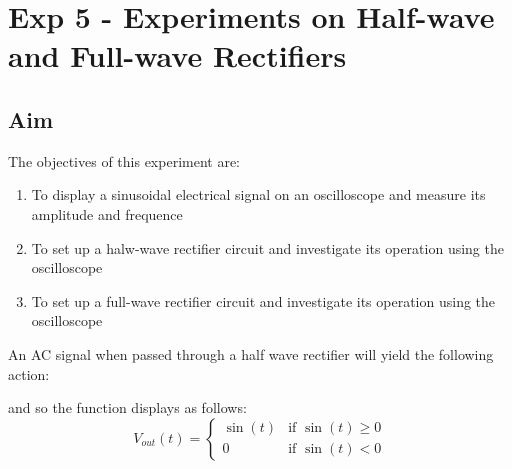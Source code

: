 \documentclass[a4paper]{article}
\begin{document}
\section{Exp 5 - Experiments on Half-wave and Full-wave Rectifiers}

\subsection{Aim}

The objectives of this experiment are:

\begin{enumerate}
    \item To display a sinusoidal electrical signal on an oscilloscope and measure its amplitude and frequence
    \item To set up a halw-wave rectifier circuit and investigate its operation using the oscilloscope
    \item To set up a full-wave rectifier circuit and investigate its operation using the oscilloscope
\end{enumerate}

An AC signal when passed through a half wave rectifier will yield the following action:

\begin{figure}[H]
    \centering
\end{figure}
and so the function displays as follows:
\[V_{out}(t)=\begin{cases}\sin(t)&\text{if }\sin(t)\ge0\\0&\text{if }\sin(t)<0\end{cases}\]
\end{document}
